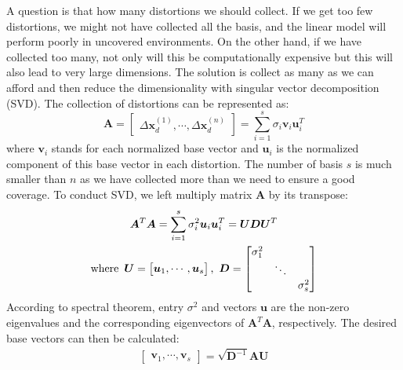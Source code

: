 \documentclass[journal]{IEEEtran}
\begin{document}
A question is that how many distortions we should collect.
If we get too few distortions, we might not have collected all the basis, and the linear model will perform poorly in uncovered environments.
On the other hand, if we have collected too many, not only will this be computationally expensive but this will also lead to very large dimensions. 
The solution is collect as many as we can afford and then reduce the dimensionality with singular vector decomposition (SVD). The collection of distortions can be represented as:
\begin{equation}
\bm{A} = 
\begin{bmatrix}
\Delta \bm{x}_d^{(1)}, \cdots, \Delta \bm{x}_d^{(n)}
\end{bmatrix}
= \sum_{i=1}^s \sigma_i \bm{v}_i \bm{u}_i^T
\label{SVD}
\end{equation}
where $\bm{v}_i$ stands for each normalized base vector and $\bm{u}_i$ is the normalized component of this base vector in each distortion.
The number of basis $s$ is much smaller than $n$ as we have collected more than we need to ensure a good coverage.
To conduct SVD, we left multiply matrix $\bm{A}$ by its transpose:
\begin{equation}
\begin{gathered}
\bm{A}^T \bm{A} = 
\sum_{i=1}^s \sigma_i^2 \bm{u}_i \bm{u}_i^T = \bm{U} \bm{D} \bm{U}^T
\\
\text{where \,}
\bm{U} = 
\begin{bmatrix}
\bm{u}_1, \cdots, \bm{u}_s
\end{bmatrix}
\text{, \,}
\bm{D} = 
\begin{bmatrix}
\sigma_1^2 &  &  \\
 & \ddots &  \\
 &  & \sigma_s^2 \\
\end{bmatrix}
\end{gathered}
\label{ATA}
\end{equation}
According to spectral theorem, entry $\sigma^2$ and vectors $\bm{u}$  are the non-zero eigenvalues and the corresponding eigenvectors of $\bm{A}^T\bm{A}$, respectively. 
The desired base vectors can then be calculated:
\begin{equation}
\begin{gathered}
\begin{bmatrix}
\bm{v}_1, \cdots, \bm{v}_s
\end{bmatrix} = 
\sqrt{\bm{D}^{-1}} \bm{A} \bm{U}
\end{gathered}
\label{basis}
\end{equation}
\end{document}
